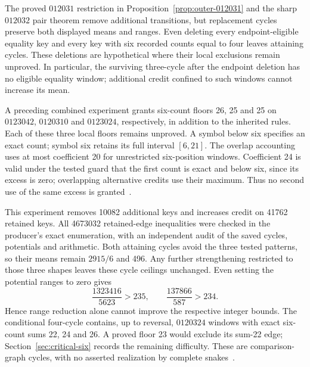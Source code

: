 \documentclass[11pt,a4paper]{article}
\theoremstyle{definition}
\theoremstyle{remark}
\begin{document}
The proved $012031$ restriction in Proposition~\ref{prop:outer-012031} and
the sharp $012032$ pair theorem remove additional transitions, but
replacement cycles preserve both displayed means and ranges. Even deleting
every endpoint-eligible equality key and every key with six recorded counts
equal to four leaves attaining cycles. These deletions are hypothetical
where their local exclusions remain unproved. In particular, the surviving
three-cycle after the endpoint deletion has no eligible equality window;
additional credit confined to such windows cannot increase its mean.

A preceding combined experiment grants six-count floors 26, 25 and 25 on
$0123042$, $0120310$ and $0123024$, respectively, in addition to the inherited
rules. Each of these three local floors remains unproved. A symbol below
six specifies an exact count; symbol six retains its full interval
$[6,21]$. The overlap accounting uses at most coefficient 20 for unrestricted
six-position windows. Coefficient 24 is valid under the tested guard that
the first count is exact and below six, since its excess is zero; overlapping
alternative credits use their maximum. Thus no second use of the same
excess is granted~\cite{latersumarchive,uniformsixarchive}.

This experiment removes 10082 additional keys and increases credit on
41762 retained keys. All 4673032 retained-edge inequalities were checked in
the producer's exact enumeration, with an independent audit of the saved
cycles, potentials and arithmetic. Both attaining cycles avoid the three
tested patterns, so their means remain $2915/6$ and 496. Any further
strengthening restricted to those three shapes leaves these cycle ceilings
unchanged. Even setting the potential ranges to zero gives
\[
\frac{1323416}{5623}>235,\qquad
\frac{137866}{587}>234.
\]
Hence range reduction alone cannot improve the respective integer bounds.
The conditional four-cycle contains, up to reversal, $0120324$ windows with
exact six-count sums 22, 24 and 26. A proved floor 23 would exclude its
sum-22 edge; Section~\ref{sec:critical-six} records the remaining difficulty.
These are comparison-graph cycles, with no asserted realization by complete
snakes~\cite{uniformsixarchive,criticalsixarchive}.
\end{document}
